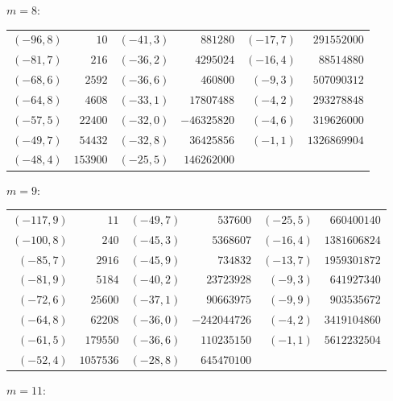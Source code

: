 \noindent$m=8$:\nopagebreak\\[2pt]
{\small\begin{tabular}{@{}r@{\ \ }r@{\qquad}r@{\ \ }r@{\qquad}r@{\ \ }r@{}}
$(-96,8)$ & $10$ & $(-41,3)$ & $881280$ & $(-17,7)$ & $291552000$ \\
$(-81,7)$ & $216$ & $(-36,2)$ & $4295024$ & $(-16,4)$ & $88514880$ \\
$(-68,6)$ & $2592$ & $(-36,6)$ & $460800$ & $(-9,3)$ & $507090312$ \\
$(-64,8)$ & $4608$ & $(-33,1)$ & $17807488$ & $(-4,2)$ & $293278848$ \\
$(-57,5)$ & $22400$ & $(-32,0)$ & $-46325820$ & $(-4,6)$ & $319626000$ \\
$(-49,7)$ & $54432$ & $(-32,8)$ & $36425856$ & $(-1,1)$ & $1326869904$ \\
$(-48,4)$ & $153900$ & $(-25,5)$ & $146262000$ & & \\
\end{tabular}}\par\medskip
\noindent$m=9$:\nopagebreak\\[2pt]
{\small\begin{tabular}{@{}r@{\ \ }r@{\qquad}r@{\ \ }r@{\qquad}r@{\ \ }r@{}}
$(-117,9)$ & $11$ & $(-49,7)$ & $537600$ & $(-25,5)$ & $660400140$ \\
$(-100,8)$ & $240$ & $(-45,3)$ & $5368607$ & $(-16,4)$ & $1381606824$ \\
$(-85,7)$ & $2916$ & $(-45,9)$ & $734832$ & $(-13,7)$ & $1959301872$ \\
$(-81,9)$ & $5184$ & $(-40,2)$ & $23723928$ & $(-9,3)$ & $641927340$ \\
$(-72,6)$ & $25600$ & $(-37,1)$ & $90663975$ & $(-9,9)$ & $903535672$ \\
$(-64,8)$ & $62208$ & $(-36,0)$ & $-242044726$ & $(-4,2)$ & $3419104860$ \\
$(-61,5)$ & $179550$ & $(-36,6)$ & $110235150$ & $(-1,1)$ & $5612232504$ \\
$(-52,4)$ & $1057536$ & $(-28,8)$ & $645470100$ & & \\
\end{tabular}}\par\medskip
\noindent$m=11$:\nopagebreak\\[2pt]
